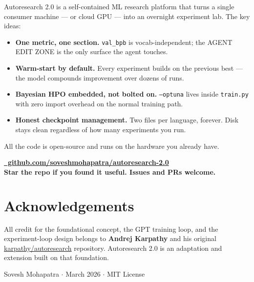 \documentclass[12pt, a4paper]{article}
\newcommand{\bpb}{\texttt{val\_bpb}}
\newcommand{\trainpy}{\texttt{train.py}}
\newcommand{\code}[1]{\texttt{#1}}
\begin{document}
Autoresearch 2.0 is a self-contained ML research platform that turns a single consumer
machine — or cloud GPU — into an overnight experiment lab. The key ideas:

\begin{itemize}[leftmargin=*, itemsep=3pt]
  \item \textbf{One metric, one section.} \bpb{} is vocab-independent; the AGENT EDIT ZONE
    is the only surface the agent touches.
  \item \textbf{Warm-start by default.} Every experiment builds on the previous best —
    the model compounds improvement over dozens of runs.
  \item \textbf{Bayesian HPO embedded, not bolted on.} \code{--optuna} lives inside
    \trainpy{} with zero import overhead on the normal training path.
  \item \textbf{Honest checkpoint management.} Two files per language, forever. Disk stays
    clean regardless of how many experiments you run.
\end{itemize}

All the code is open-source and runs on the hardware you already have.

\begin{center}
\begin{tcolorbox}[statcard, width=0.8\linewidth, halign=center]
  \large\bfseries
  \href{https://github.com/soveshmohapatra/autoresearch-2.0}{%
    ~github.com/soveshmohapatra/autoresearch-2.0}\\[6pt]
  \normalfont\small\color{warmgray}
  Star the repo if you found it useful.
  Issues and PRs welcome.
\end{tcolorbox}
\end{center}

\section*{Acknowledgements}

All credit for the foundational concept, the GPT training loop, and the
experiment-loop design belongs to \textbf{Andrej Karpathy} and his original
\href{https://github.com/karpathy/autoresearch}{karpathy/autoresearch} repository.
Autoresearch 2.0 is an adaptation and extension built on that foundation.

\vfill
\begin{center}
\small\color{warmgray}
Sovesh Mohapatra $\cdot$ March 2026 $\cdot$ MIT License
\end{center}
\end{document}
